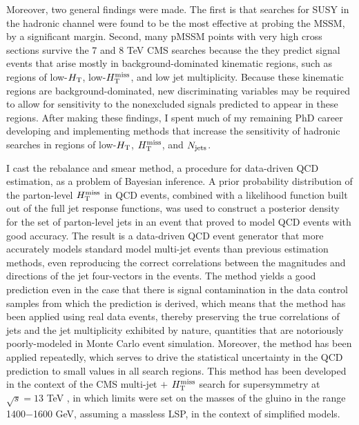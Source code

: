 Moreover, two general findings were made. The first is that searches for SUSY in the hadronic channel were found to be the most effective at probing the MSSM, by a significant margin. Second, many pMSSM points with very high cross sections survive the 7 and 8 TeV CMS searches because the they predict signal events that arise mostly in background-dominated kinematic regions, such as regions of low-$H_{\rm T}$, low-$H_{\text{T}}^{\rm miss}$, and low jet multiplicity. Because these kinematic regions are background-dominated, new discriminating variables may be required to allow for sensitivity to the nonexcluded signals predicted to appear in these regions. After making these findings, I spent much of my remaining PhD career developing and implementing methods that increase the sensitivity of hadronic searches in regions of low-$H_{\rm T}$, $H_{\text{T}}^{\rm miss}$, and $N_{\rm jets}$. 

I cast the rebalance and smear method, a procedure for data-driven QCD estimation, as a problem of Bayesian inference. A prior probability distribution of the parton-level $H_{\text{T}}^{\rm miss}$ in QCD events, combined with a likelihood function built out of the full jet response functions, was used to construct a posterior density for the set of parton-level jets in an event that proved to model QCD events with good accuracy. The result is a data-driven QCD event generator that more accurately models standard model multi-jet events than previous estimation methods, even reproducing the correct correlations between the magnitudes and directions of the jet four-vectors in the events. The method yields a good prediction even in the case that there is signal contamination in the data control samples from which the prediction is derived, which means that the method has been applied using real data events, thereby preserving the true correlations of jets and the jet multiplicity exhibited by nature, quantities that are notoriously poorly-modeled in Monte Carlo event simulation. Moreover, the method has been applied repeatedly, which serves to drive the statistical uncertainty in the QCD prediction to small values in all search regions. This method has been developed in the context of the CMS multi-jet $+$ $H_{\text{T}}^{\rm miss}$ search for supersymmetry at $\sqrt{s}=13$ TeV \cite{Khachatryan:2016kdk}, in which limits were set on the masses of the gluino in the range 1400$-$1600 GeV, assuming a massless LSP, in the context of simplified models.

